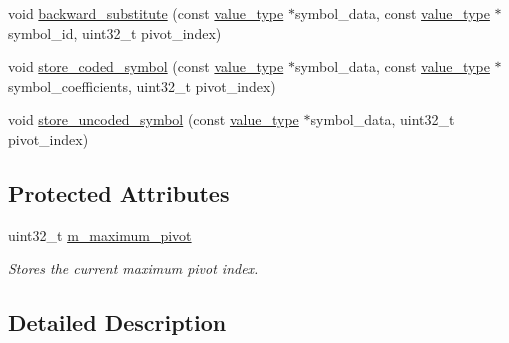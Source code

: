 \begin{DoxyCompactItemize}
\item 
void \hyperlink{classkodo_1_1bidirectional__linear__block__decoder_a59d756689d2b2096c3dcb6568ff3de92}{backward\-\_\-substitute} (const \hyperlink{classkodo_1_1bidirectional__linear__block__decoder_a2039f4bd553ca7826a233080a7ecb230}{value\-\_\-type} $\ast$symbol\-\_\-data, const \hyperlink{classkodo_1_1bidirectional__linear__block__decoder_a2039f4bd553ca7826a233080a7ecb230}{value\-\_\-type} $\ast$symbol\-\_\-id, uint32\-\_\-t pivot\-\_\-index)
\item 
void \hyperlink{classkodo_1_1bidirectional__linear__block__decoder_a08b15a0142bbb5322a66a2808b1c2103}{store\-\_\-coded\-\_\-symbol} (const \hyperlink{classkodo_1_1bidirectional__linear__block__decoder_a2039f4bd553ca7826a233080a7ecb230}{value\-\_\-type} $\ast$symbol\-\_\-data, const \hyperlink{classkodo_1_1bidirectional__linear__block__decoder_a2039f4bd553ca7826a233080a7ecb230}{value\-\_\-type} $\ast$symbol\-\_\-coefficients, uint32\-\_\-t pivot\-\_\-index)
\item 
void \hyperlink{classkodo_1_1bidirectional__linear__block__decoder_aa20cceb9c74d72bdbe5f3b8b0289f169}{store\-\_\-uncoded\-\_\-symbol} (const \hyperlink{classkodo_1_1bidirectional__linear__block__decoder_a2039f4bd553ca7826a233080a7ecb230}{value\-\_\-type} $\ast$symbol\-\_\-data, uint32\-\_\-t pivot\-\_\-index)
\end{DoxyCompactItemize}
\subsection*{Protected Attributes}
\begin{DoxyCompactItemize}
\item 
\hypertarget{classkodo_1_1bidirectional__linear__block__decoder_ad2602593dfecc8254c1a1148ef08ddc2}{uint32\-\_\-t \hyperlink{classkodo_1_1bidirectional__linear__block__decoder_ad2602593dfecc8254c1a1148ef08ddc2}{m\-\_\-maximum\-\_\-pivot}}\label{classkodo_1_1bidirectional__linear__block__decoder_ad2602593dfecc8254c1a1148ef08ddc2}

\begin{DoxyCompactList}\small\item\em Stores the current maximum pivot index. \end{DoxyCompactList}\end{DoxyCompactItemize}


\subsection{Detailed Description}
